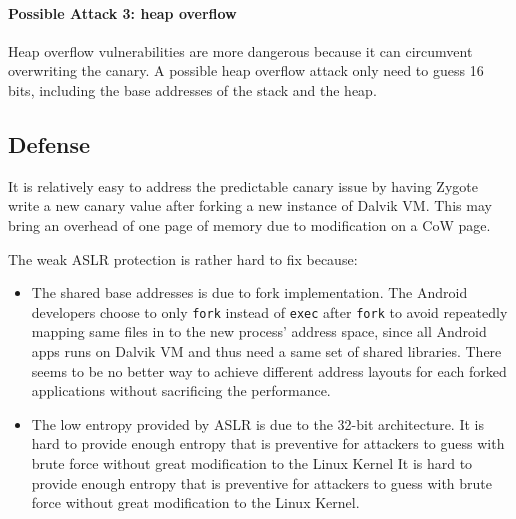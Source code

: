 \paragraph*{Possible Attack 3: heap overflow}

Heap overflow vulnerabilities are more dangerous because it can circumvent overwriting the canary. A possible heap overflow attack only need to guess 16 bits, including the base addresses of the stack and the heap.

\subsection{Defense}

It is relatively easy to address the predictable canary issue by having Zygote write a new canary value after forking a new instance of Dalvik VM. This may bring an overhead of one page of memory due to modification on a CoW page.

The weak ASLR protection is rather hard to fix because:
\begin{itemize}
\item The shared base addresses is due to fork implementation. The Android developers choose to only \verb|fork| instead of \verb|exec| after \verb|fork| to avoid repeatedly mapping same files in to the new process' address space, since all Android apps runs on Dalvik VM and thus need a same set of shared libraries. There seems to be no better way to achieve different address layouts for each forked applications without sacrificing the performance.

\item The low entropy provided by ASLR is due to the 32-bit architecture. It is hard to provide enough entropy that is preventive for attackers to guess with brute force without great modification to the Linux Kernel It is hard to provide enough entropy that is preventive for attackers to guess with brute force without great modification to the Linux Kernel.

\end{itemize}


